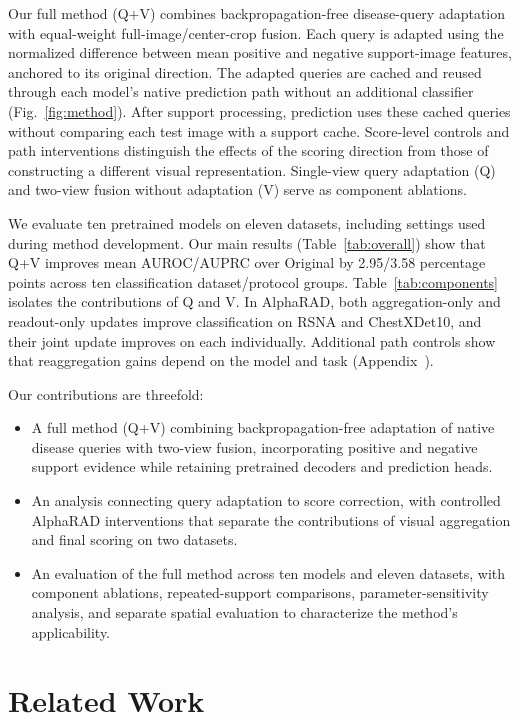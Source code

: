 \documentclass[10pt,twocolumn,letterpaper]{article}
\begin{document}
Our full method (Q+V) combines backpropagation-free disease-query adaptation with equal-weight full-image/center-crop fusion. Each query is adapted using the normalized difference between mean positive and negative support-image features, anchored to its original direction. The adapted queries are cached and reused through each model's native prediction path without an additional classifier (Fig.~\ref{fig:method}). After support processing, prediction uses these cached queries without comparing each test image with a support cache. Score-level controls and path interventions distinguish the effects of the scoring direction from those of constructing a different visual representation. Single-view query adaptation (Q) and two-view fusion without adaptation (V) serve as component ablations.

We evaluate ten pretrained models on eleven datasets, including settings used during method development. Our main results (Table~\ref{tab:overall}) show that Q+V improves mean AUROC/AUPRC over Original by 2.95/3.58 percentage points across ten classification dataset/protocol groups. Table~\ref{tab:components} isolates the contributions of Q and V. In AlphaRAD, both aggregation-only and readout-only updates improve classification on RSNA and ChestXDet10, and their joint update improves on each individually. Additional path controls show that reaggregation gains depend on the model and task (Appendix~).

Our contributions are threefold:
\begin{itemize}
    \item A full method (Q+V) combining backpropagation-free adaptation of native disease queries with two-view fusion, incorporating positive and negative support evidence while retaining pretrained decoders and prediction heads.
    \item An analysis connecting query adaptation to score correction, with controlled AlphaRAD interventions that separate the contributions of visual aggregation and final scoring on two datasets.
    \item An evaluation of the full method across ten models and eleven datasets, with component ablations, repeated-support comparisons, parameter-sensitivity analysis, and separate spatial evaluation to characterize the method's applicability.
\end{itemize}

\section{Related Work}
\label{sec:related}
\end{document}
